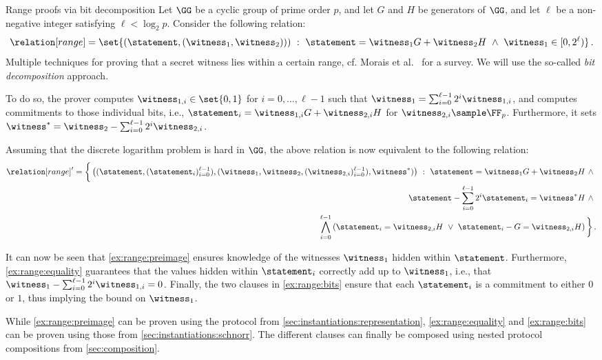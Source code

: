 \documentclass[11pt]{article}
\begin{document}
\begin{example}{Range proofs via bit decomposition}{}
  Let $\GG$ be a cyclic group of prime order $p$, and let $G$ and $H$ be generators of $\GG$, and let $\ell$ be a non-negative integer satisfying $\ell<\log_2 p$.
	Consider the following relation:
  $$
	  \relation[range] = \set{\left(\statement,(\witness_1,\witness_2))\right)~:~\statement=\witness_1 G +\witness_2 H ~\land~ \witness_1\in[0,2^\ell)}\,.
	$$
	Multiple techniques for proving that a secret witness lies within a certain range, cf. Morais et al.~\cite{range-proof-survey} for a survey.
	We will use the so-called \emph{bit decomposition} approach.

	To do so, the prover computes $\witness_{1,i}\in\set{0,1}$ for $i=0,\dots,\ell-1$ such that $\witness_1=\sum_{i=0}^{\ell-1}2^i\witness_{1,i}$, and computes commitments to those individual bits, i.e., $\statement_i=\witness_{1,i}G+\witness_{2,i}H$ for $\witness_{2,i}\sample\FF_p$.
	Furthermore, it sets $\witness^*=\witness_2-\sum_{i=0}^{\ell-1}2^i\witness_{2,i}$.

  Assuming that the discrete logarithm problem is hard in $\GG$, the above relation is now equivalent to the following relation:
  \begin{align}
	  \relation[range]' = \bigg\{\left((\statement,(\statement_i)_{i=0}^{\ell-1}),(\witness_1,\witness_2,(\witness_{2,i})_{i=0}^{\ell-1}),\witness^*)\right)~:~ 		\statement=\witness_1 G +\witness_2 H ~\land~ \label{ex:range:preimage}\\
		\statement-\sum_{i=0}^{\ell-1} 2^i\statement_i = \witness^* H ~\land~  \label{ex:range:equality}\\
		\bigwedge_{i=0}^{\ell-1} \left(\statement_i=\witness_{2,i}H ~\lor~ \statement_i-G=\witness_{2,i}H\right)\bigg\}\,.\label{ex:range:bits}
	\end{align}

	It can now be seen that \cref{ex:range:preimage} ensures knowledge of the witnesses $\witness_1$ hidden within $\statement$.
	Furthermore, \cref{ex:range:equality} guarantees that the values hidden within $\statement_i$ correctly add up to $\witness_1$, i.e., that $\witness_1-\sum_{i=0}^{\ell-1}2^i\witness_{1,i}=0$.
  Finally, the two clauses in \cref{ex:range:bits} ensure that each $\statement_i$ is a commitment to either $0$ or $1$, thus implying the bound on $\witness_1$.

	While \cref{ex:range:preimage} can be proven using the protocol from \cref{sec:instantiations:representation}, \cref{ex:range:equality} and \cref{ex:range:bits} can be proven using those from \cref{sec:instantiations:schnorr}.
	The different clauses can finally be composed using nested protocol compositions from \cref{sec:composition}.
\end{example}
\end{document}
